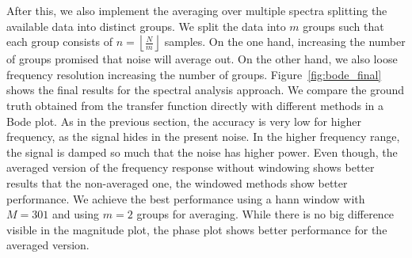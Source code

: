 \documentclass{scrartcl}
\begin{document}
After this, we also implement the averaging over multiple spectra splitting the available data into distinct groups.
We split the data into $m$ groups such that each group consists of $n = \left\lfloor\frac{N}{m}\right\rfloor$ samples.
On the one hand, increasing the number of groups promised that noise will average out.
On the other hand, we also loose frequency resolution increasing the number of groups.
Figure~\ref{fig:bode_final} shows the final results for the spectral analysis approach.
We compare the ground truth obtained from the transfer function directly with different methods in a Bode plot.
As in the previous section, the accuracy is very low for higher frequency, as the signal hides in the present noise.
In the higher frequency range, the signal is damped so much that the noise has higher power.
Even though, the averaged version of the frequency response without windowing shows better results that the non-averaged one, the windowed methods show better performance.
We achieve the best performance using a hann window with $M=301$ and using $m=2$ groups for averaging.
While there is no big difference visible in the magnitude plot, the phase plot shows better performance for the averaged version.
\end{document}
